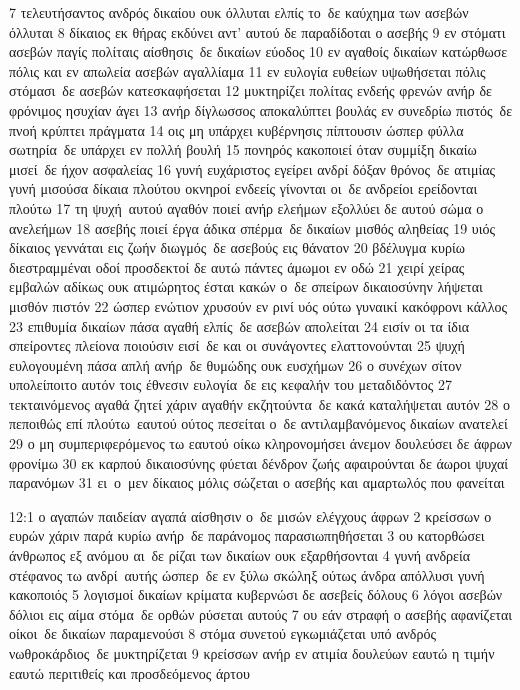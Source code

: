 \documentclass[10pt,oneside,footinclude=true,headinclude=true]{scrbook} %
\begin{document}
7 τελευτήσαντος ανδρός δικαίου ουκ όλλυται ελπίς το δε καύχημα των ασεβών όλλυται
8 δίκαιος εκ θήρας εκδύνει αντ' αυτού δε παραδίδοται ο ασεβής
9 εν στόματι ασεβών παγίς πολίταις αίσθησις δε δικαίων εύοδος
10 εν αγαθοίς δικαίων κατώρθωσε πόλις και εν απωλεία ασεβών αγαλλίαμα
11 εν ευλογία ευθείων υψωθήσεται πόλις στόμασι δε ασεβών κατεσκαφήσεται
12 μυκτηρίζει πολίτας ενδεής φρενών ανήρ δε φρόνιμος ησυχίαν άγει
13 ανήρ δίγλωσσος αποκαλύπτει βουλάς εν συνεδρίω πιστός δε πνοή κρύπτει πράγματα
14 οις μη υπάρχει κυβέρνησις πίπτουσιν ώσπερ φύλλα σωτηρία δε υπάρχει εν πολλή βουλή
15 πονηρός κακοποιεί όταν συμμίξη δικαίω μισεί δε ήχον ασφαλείας
16 γυνή ευχάριστος εγείρει ανδρί δόξαν θρόνος δε ατιμίας γυνή μισούσα δίκαια πλούτου οκνηροί ενδεείς γίνονται οι δε ανδρείοι ερείδονται πλούτω
17 τη ψυχή αυτού αγαθόν ποιεί ανήρ ελεήμων εξολλύει δε αυτού σώμα ο ανελεήμων
18 ασεβής ποιεί έργα άδικα σπέρμα δε δικαίων μισθός αληθείας
19 υιός δίκαιος γεννάται εις ζωήν διωγμός δε ασεβούς εις θάνατον
20 βδέλυγμα κυρίω διεστραμμέναι οδοί προσδεκτοί δε αυτώ πάντες άμωμοι εν οδώ
21 χειρί χείρας εμβαλών αδίκως ουκ ατιμώρητος έσται κακών ο δε σπείρων δικαιοσύνην λήψεται μισθόν πιστόν
22 ώσπερ ενώτιον χρυσούν εν ρινί υός ούτω γυναικί κακόφρονι κάλλος
23 επιθυμία δικαίων πάσα αγαθή ελπίς δε ασεβών απολείται
24 εισίν οι τα ίδια σπείροντες πλείονα ποιούσιν εισί δε και οι συνάγοντες ελαττονούνται
25 ψυχή ευλογουμένη πάσα απλή ανήρ δε θυμώδης ουκ ευσχήμων
26 ο συνέχων σίτον υπολείποιτο αυτόν τοις έθνεσιν ευλογία δε εις κεφαλήν του μεταδιδόντος
27 τεκταινόμενος αγαθά ζητεί χάριν αγαθήν εκζητούντα δε κακά καταλήψεται αυτόν
28 ο πεποιθώς επί πλούτω εαυτού ούτος πεσείται ο δε αντιλαμβανόμενος δικαίων ανατελεί
29 ο μη συμπεριφερόμενος τω εαυτού οίκω κληρονομήσει άνεμον δουλεύσει δε άφρων φρονίμω
30 εκ καρπού δικαιοσύνης φύεται δένδρον ζωής αφαιρούνται δε άωροι ψυχαί παρανόμων
31 ει ο μεν δίκαιος μόλις σώζεται ο ασεβής και αμαρτωλός που φανείται
\par
12:1 ο αγαπών παιδείαν αγαπά αίσθησιν ο δε μισών ελέγχους άφρων
2 κρείσσων ο ευρών χάριν παρά κυρίω ανήρ δε παράνομος παρασιωπηθήσεται
3 ου κατορθώσει άνθρωπος εξ ανόμου αι δε ρίζαι των δικαίων ουκ εξαρθήσονται
4 γυνή ανδρεία στέφανος τω ανδρί αυτής ώσπερ δε εν ξύλω σκώληξ ούτως άνδρα απόλλυσι γυνή κακοποιός
5 λογισμοί δικαίων κρίματα κυβερνώσι δε ασεβείς δόλους
6 λόγοι ασεβών δόλιοι εις αίμα στόμα δε ορθών ρύσεται αυτούς
7 ου εάν στραφή ο ασεβής αφανίζεται οίκοι δε δικαίων παραμενούσι
8 στόμα συνετού εγκωμιάζεται υπό ανδρός νωθροκάρδιος δε μυκτηρίζεται
9 κρείσσων ανήρ εν ατιμία δουλεύων εαυτώ η τιμήν εαυτώ περιτιθείς και προσδεόμενος άρτου
\end{document}
